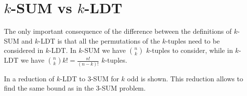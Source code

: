 \section{$k$-SUM vs $k$-LDT}

The only important consequence of the difference between the definitions of
$k$-SUM and $k$-LDT is that all the permutations of the $k$-tuples need to be
considered in $k$-LDT. In $k$-SUM we have $\binom{n}{k}$ $k$-tuples to consider,
while in $k$-LDT we have $\binom{n}{k} k! = \frac{n!}{(n-k)!}$ $k$-tuples.

In \cite{gronlund:2014} a reduction of $k$-LDT to $3$-SUM for $k$ odd is shown.
This reduction allows to find the same 
bound as in the $3$-SUM problem.

